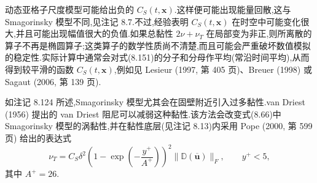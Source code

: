 \begin{note}[动态 Smagorinsky 模型]
动态亚格子尺度模型可能给出负的 $C_S(t,\bm{x})$.这样便可能出现能量回散,这与 Smagorinsky 模型不同,见注记 8.7.不过,经验表明 $C_S(t,\bm{x})$ 在时空中可能变化很大,并且可能出现幅值很大的负值.如果总黏性 $2\nu+\nu_T$ 在局部变为非正,则所离散的算子不再是椭圆算子;这类算子的数学性质尚不清楚,而且可能会严重破坏数值模拟的稳定性.实际计算中通常会对式(8.151)的分子和分母作平均(常沿时间平均),从而得到较平滑的函数 $C_S(t,\bm{x})$,例如见 Lesieur (1997, 第 405 页)、Breuer (1998) 或 Sagaut (2006, 第 139 页).
\end{note}

\begin{note}
\label{note:van-driest-damping}
如注记 8.124 所述,Smagorinsky 模型尤其会在固壁附近引入过多黏性.van Driest (1956) 提出的 van Driest 阻尼可以减弱这种黏性.该方法会改变式(8.66)中 Smagorinsky 模型的涡黏性,并在黏性底层(见注记 8.13)内采用 Pope (2000, 第 599 页) 给出的表达式
\begin{equation}\label{eq:van-driest-damping}
\nu_T=C_S\delta^2
 \left(1-\exp\left(-\frac{y^+}{A^+}\right)\right)^2
 \|\mathbb{D}(\overline{\bm{u}})\|_F,
\qquad y^+<5,
\end{equation}
其中 $A^+=26$.
\end{note}

